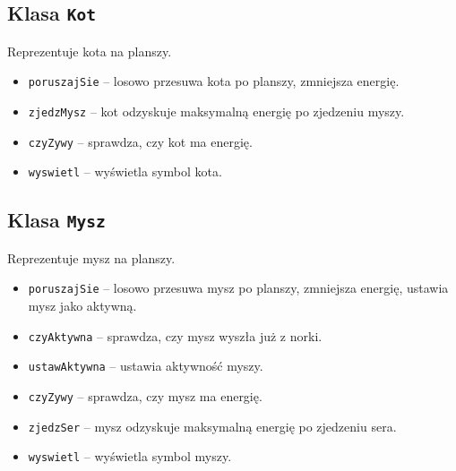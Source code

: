 \documentclass{article}
\begin{document}
\subsection*{Klasa \texttt{Kot}}
Reprezentuje kota na planszy.
\begin{itemize}
  \item \texttt{poruszajSie} -- losowo przesuwa kota po planszy, zmniejsza energię.
  \item \texttt{zjedzMysz} -- kot odzyskuje maksymalną energię po zjedzeniu myszy.
  \item \texttt{czyZywy} -- sprawdza, czy kot ma energię.
  \item \texttt{wyswietl} -- wyświetla symbol kota.
\end{itemize}

\subsection*{Klasa \texttt{Mysz}}
Reprezentuje mysz na planszy.
\begin{itemize}
  \item \texttt{poruszajSie} -- losowo przesuwa mysz po planszy, zmniejsza energię, ustawia mysz jako aktywną.
  \item \texttt{czyAktywna} -- sprawdza, czy mysz wyszła już z norki.
  \item \texttt{ustawAktywna} -- ustawia aktywność myszy.
  \item \texttt{czyZywy} -- sprawdza, czy mysz ma energię.
  \item \texttt{zjedzSer} -- mysz odzyskuje maksymalną energię po zjedzeniu sera.
  \item \texttt{wyswietl} -- wyświetla symbol myszy.
\end{itemize}
\end{document}
